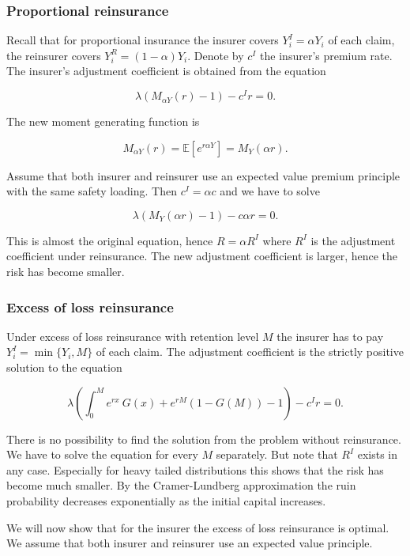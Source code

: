 \documentclass[a4paper,12pt,openany]{book}
\begin{document}
\hypertarget{proportional-reinsurance}{%
\subsubsection{Proportional reinsurance}\label{proportional-reinsurance}}

Recall that for proportional insurance the insurer covers \(Y_i^I = \alpha Y_i\) of each claim, the reinsurer covers \(Y_i^R = (1 − \alpha )Y_i\). Denote by \(c^I\) the insurer's premium rate. The insurer's adjustment coefficient is obtained from the equation

\[
\lambda (M_{\alpha Y} (r) − 1) − c^Ir = 0.
\]

The new moment generating function is

\[
M_{\alpha Y} (r) = \mathbb E [e^{r\alpha Y}] = M_Y (\alpha r).
\]

Assume that both insurer and reinsurer use an expected value premium principle with the same safety loading. Then \(c^I = \alpha c\) and we have to solve

\[
\lambda (M_Y (\alpha r) − 1) − c\alpha r = 0.
\]

This is almost the original equation, hence \(R = \alpha R^I\) where \(R^I\) is the adjustment coefficient under reinsurance. The new adjustment coefficient is larger, hence the risk has become smaller.

\hypertarget{excess-of-loss-reinsurance}{%
\subsubsection{Excess of loss reinsurance}\label{excess-of-loss-reinsurance}}

Under excess of loss reinsurance with retention level \(M\) the insurer has to pay \(Y_i^I = \min\{Y_i,M\}\) of each claim. The adjustment coefficient is the strictly positive solution to the equation

\[
\lambda \left(\int_0^Me^{rx}\ G(x) + e^{rM}(1-G(M))-1\right)-c^Ir=0.
\]

There is no possibility to find the solution from the problem without reinsurance. We have to solve the equation for every \(M\) separately. But note that \(R^I\) exists in any case. Especially for heavy tailed distributions this shows that the risk has become much smaller. By the Cramer-Lundberg approximation the ruin probability decreases exponentially as the initial capital increases.

We will now show that for the insurer the excess of loss reinsurance is optimal. We assume that both insurer and reinsurer use an expected value principle.
\end{document}
